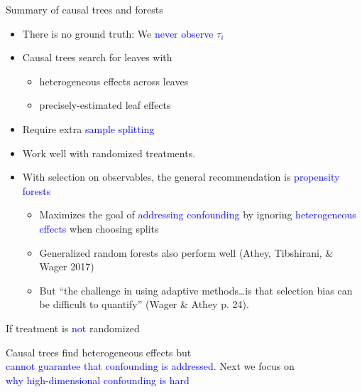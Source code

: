 \documentclass{beamer}
\newcommand\indep{\protect\mathpalette{\protect\independenT}{\perp}}
\def\independenT#1#2{\mathrel{\rlap{$#1#2$}\mkern2mu{#1#2}}}
\newcommand{\blue}[1]{\textcolor{blue}{#1}}
\begin{document}
\begin{frame}{Summary of causal trees and forests}
\begin{itemize}
\item There is no ground truth: We \blue{never observe $\tau_i$} \pause
\item Causal trees search for leaves with
\begin{itemize}
\item heterogeneous effects across leaves
\item precisely-estimated leaf effects
\end{itemize} \pause
\item Require extra \blue{sample splitting} \pause
\item Work well with randomized treatments. \pause
\item With selection on observables, the general recommendation is \blue{propensity forests}
\begin{itemize}
\item Maximizes the goal of \blue{addressing confounding} by ignoring \blue{heterogeneous effects} when choosing splits \pause
\item Generalized random forests also perform well {\footnotesize{(Athey, Tibshirani, \& Wager 2017)}} \pause
\item But ``the challenge in using adaptive methods\dots is that selection bias can be difficult to quantify'' {\footnotesize (Wager \& Athey p. 24)}.
\end{itemize}
\end{itemize}
\end{frame}

\begin{frame}{If treatment is \blue{not} randomized}
\begin{center}
\LARGE 
Causal trees find heterogeneous effects but \\
\blue{cannot guarantee that confounding is addressed.} \vskip 1cm
Next we focus on \\
\blue{why high-dimensional confounding is hard}
\end{center}
\end{frame}
\end{document}
